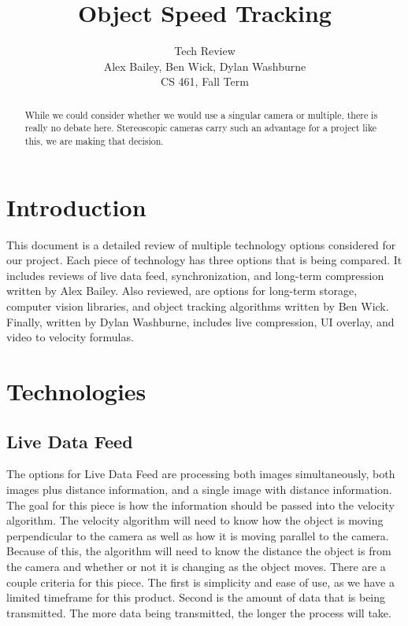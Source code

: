 \documentclass[letterpaper,10pt,onecolumn,draftclsnofoot]{IEEEtran}
\title{Object Speed Tracking}
\author{Tech Review\\Alex Bailey, Ben Wick, Dylan Washburne\\CS 461, Fall Term}
\begin{document}
\begin{titlepage}

\maketitle

\begin{abstract}
While we could consider whether we would use a singular camera or multiple, there is really no debate here.
Stereoscopic cameras carry such an advantage for a project like this, we are making that decision.
 
\end{abstract}

\end{titlepage}

\tableofcontents
\newpage

\section{Introduction}
This document is a detailed review of multiple technology options considered for our project. Each piece of technology has three options that is being compared. It includes reviews of live data feed, synchronization, and long-term compression written by Alex Bailey. Also reviewed, are options for long-term storage, computer vision libraries, and object tracking algorithms written by Ben Wick. Finally, written by Dylan Washburne, includes live compression, UI overlay, and video to velocity formulas.

\section{Technologies}

\subsection{Live Data Feed} %



The options for Live Data Feed are processing both images simultaneously, both images plus distance information, and a single image with distance information.
The goal for this piece is how the information should be passed into the velocity algorithm.
The velocity algorithm will need to know how the object is moving perpendicular to the camera as well as how it is moving parallel to the camera.
Because of this, the algorithm will need to know the distance the object is from the camera and whether or not it is changing as the object moves.
There are a couple criteria for this piece.
The first is simplicity and ease of use, as we have a limited timeframe for this product.
Second is the amount of data that is being transmitted.
The more data being transmitted, the longer the process will take.
\end{document}
